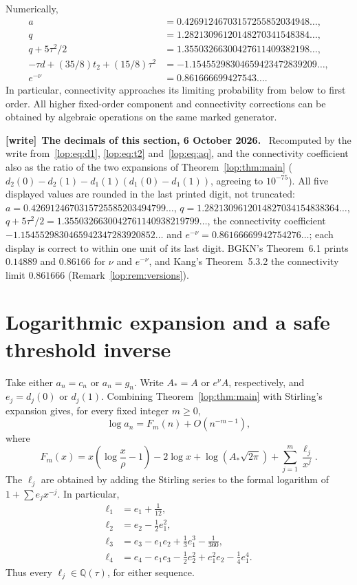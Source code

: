 \documentclass[11pt,letterpaper]{article}
\numberwithin{equation}{section}
\theoremstyle{remark}\newtheorem{remark}[theorem]{Remark}
\newcommand{\QQ}{\mathbb Q}
\newenvironment{writenote}[1][]{\par\smallskip\begingroup\small
 \noindent\textbf{[write]}\if\relax\detokenize{#1}\relax\else~\textbf{#1.}\fi\ }%
 {\par\endgroup\smallskip}
\begin{document}
Numerically,
\[
\begin{aligned}
 a&=0.42691246703157255852034948\ldots,\\
 q&=1.28213096120148270341548384\ldots,\\
 q+5\tau^2/2&=1.35503266300427611409382198\ldots,\\
 -\tau d+(35/8)t_2+(15/8)\tau^2
   &=-1.15455298304659423472839209\ldots,\\
 e^{-\nu}&=0.861666699427543\ldots.
\end{aligned}
\]
In particular, connectivity approaches its limiting probability from
below to first order. All higher fixed-order component and connectivity
corrections can be obtained by algebraic operations on the same marked
generator.

\begin{writenote}[The decimals of this section, 6 October 2026]
Recomputed by the write from~\eqref{lop:eq:d1}, \eqref{lop:eq:t2}
and~\eqref{lop:eq:aq}, and the connectivity coefficient also as the ratio of
the two expansions of Theorem~\ref{lop:thm:main} ($d_2(0)-d_2(1)-d_1(1)(d_1(0)-d_1(1))$,
agreeing to $10^{-75}$). All five displayed values are rounded in the last
printed digit, not truncated: $a=0.4269124670315725585203494799\ldots$,
$q=1.2821309612014827034154838364\ldots$,
$q+5\tau^2/2=1.3550326630042761140938219799\ldots$, the connectivity
coefficient $-1.1545529830465942347283920852\ldots$ and
$e^{-\nu}=0.86166669942754276\ldots$; each display is correct to within one
unit of its last digit. BGKN's Theorem~6.1 prints $0.14889$ and $0.86166$
for $\nu$ and $e^{-\nu}$, and Kang's Theorem~5.3.2 the connectivity limit
$0.861666$ (Remark~\ref{lop:rem:versions}).
\end{writenote}

\section{Logarithmic expansion and a safe threshold inverse}\label{lop:sec:inverse}

Take either $a_n=c_n$ or $a_n=g_n$. Write $A_*=A$ or $e^\nu A$,
respectively, and $e_j=d_j(0)$ or $d_j(1)$. Combining
Theorem~\ref{lop:thm:main} with Stirling's expansion gives, for every fixed
integer $m\geq0$,
\begin{equation}\label{lop:eq:logcount}
 \log a_n=F_m(n)+O(n^{-m-1}),
\end{equation}
where
\begin{equation}\label{lop:eq:F}
 F_m(x)=x\left(\log\frac{x}{\rho}-1\right)-2\log x
       +\log(A_*\sqrt{2\pi})+\sum_{j=1}^m\frac{\ell_j}{x^j}.
\end{equation}
The $\ell_j$ are obtained by adding the Stirling series to the formal
logarithm of $1+\sum e_jx^{-j}$. In particular,
\begin{align*}
 \ell_1&=e_1+\frac1{12},\\
 \ell_2&=e_2-\frac12e_1^2,\\
 \ell_3&=e_3-e_1e_2+\frac13e_1^3-\frac1{360},\\
 \ell_4&=e_4-e_1e_3-\frac12e_2^2+e_1^2e_2-\frac14e_1^4.
\end{align*}
Thus every $\ell_j\in\QQ(\tau)$, for either sequence.
\end{document}
